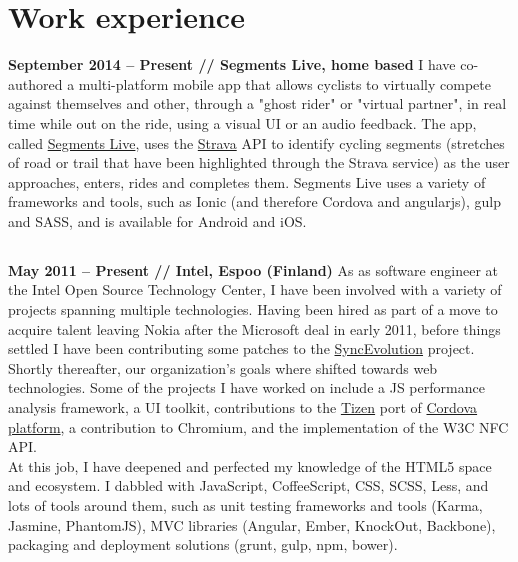 \documentclass[10pt]{tccv}
\begin{document}
		\section{Work experience}
			\textbf{September 2014 -- Present // Segments Live, home based}
				I have co-authored a multi-platform mobile app that allows cyclists to
				virtually compete against themselves and other, through a "ghost rider" or
				"virtual partner", in real time while out on the ride, using a visual UI or
				an audio feedback. The app, called
				\href{http://segmentsliveapp.com}{Segments Live}, uses the
				\href{http://strava.com}{Strava} API to identify cycling segments
				(stretches of road or trail that have been highlighted through the Strava
				service) as the user approaches, enters, rides and completes them. Segments
				Live uses a variety of frameworks and tools, such as Ionic (and therefore
				Cordova and angularjs), gulp and SASS, and is available for Android and
				iOS.

			\subsection{}
				\textbf{May 2011 -- Present // Intel, Espoo (Finland)}
				As as software engineer at the Intel Open Source Technology
				Center, I have been involved with a variety of projects
				spanning multiple technologies. Having been hired as part of a
				move to acquire talent leaving Nokia after the Microsoft deal
				in early 2011, before things settled I have been contributing
				some patches to the
				\href{https://syncevolution.org/}{SyncEvolution} project.\\

				Shortly thereafter, our organization's goals where shifted
				towards web technologies. Some of the projects I have worked on
				include a JS performance analysis framework, a UI toolkit,
				contributions to the \href{http://tizen.org}{Tizen} port of
				\href{http://cordova.apache.org/}{Cordova platform}, a
				contribution to Chromium, and the implementation of the W3C NFC
				API.\\
				
				At this job, I have deepened and perfected my knowledge of the
				HTML5 space and ecosystem. I dabbled with JavaScript,
				CoffeeScript, CSS, SCSS, Less, and lots of tools around them,
				such as unit testing frameworks and tools (Karma, Jasmine,
				PhantomJS), MVC libraries (Angular, Ember, KnockOut, Backbone),
				packaging and deployment solutions (grunt, gulp, npm, bower).
\end{document}
